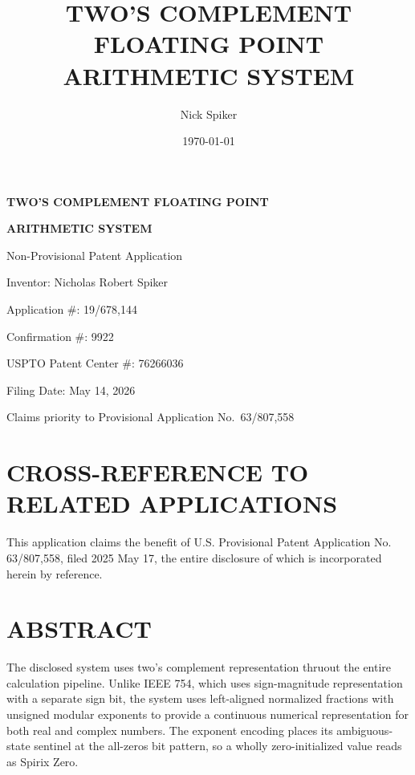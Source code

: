 \documentclass[12pt,letter]{article}
\title{\textbf{TWO'S COMPLEMENT FLOATING POINT ARITHMETIC SYSTEM}}
\author{Nick Spiker}
\date{\today}
\begin{document}
\begin{titlepage}
    \begin{center}
        \vspace*{1cm}
        {\huge \textbf{TWO'S COMPLEMENT FLOATING POINT}\par}
        {\huge \textbf{ARITHMETIC SYSTEM}\par}
        \vspace{2cm}
        {\Large Non-Provisional Patent Application\par}
        \vspace{2.5cm}
        {\Large Inventor: Nicholas Robert Spiker\par}
        \vspace{0.5cm}
        {\large Application \#: 19/678,144\par}
        {\large Confirmation \#: 9922\par}
        {\large USPTO Patent Center \#: 76266036\par}
        {\large Filing Date: May 14, 2026\par}
        \vspace{0.5cm}
        {\large Claims priority to Provisional Application No.\ 63/807,558\par}
    \end{center}
\end{titlepage}

\newpage

\setcounter{page}{2}

\section{CROSS-REFERENCE TO RELATED APPLICATIONS}

This application claims the benefit of U.S. Provisional Patent Application No. 63/807,558, filed 2025 May 17, the entire disclosure of which is incorporated herein by reference.

\newpage

\section{ABSTRACT}

The disclosed system uses two's complement representation thruout the entire calculation pipeline. Unlike IEEE 754, which uses sign-magnitude representation with a separate sign bit, the system uses left-aligned normalized fractions with unsigned modular exponents to provide a continuous numerical representation for both real and complex numbers. The exponent encoding places its ambiguous-state sentinel at the all-zeros bit pattern, so a wholly zero-initialized value reads as Spirix Zero.
\end{document}
